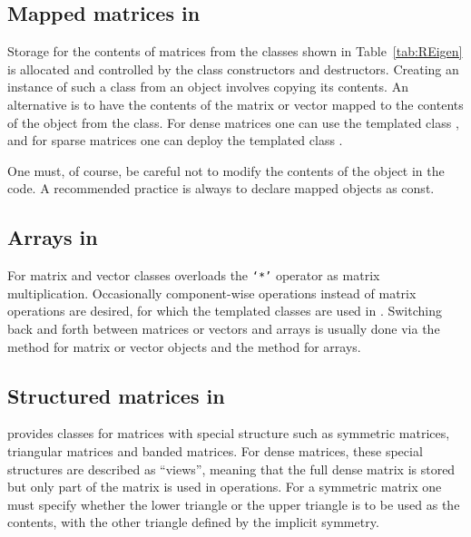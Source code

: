 \documentclass[shortnames,article]{jss}
\newcommand{\hlkwb}[1]{\textcolor[rgb]{0.13,0.54,0.13}{#1}}
\begin{document}
\subsection[Mapped matrices in Eigen]{Mapped matrices in }
\label{sec:mapped}

Storage for the contents of matrices from the classes shown in
Table~\ref{tab:REigen} is allocated and controlled by the class
constructors and destructors.  Creating an instance of such a class
from an  object involves copying its contents.  An
alternative is to have the contents of the  matrix or
vector mapped to the contents of the object from the  class.  For
dense matrices one can use the  templated class , and for
sparse matrices one can deploy the  templated class .

One must, of course, be careful not to modify the contents of the
 object in the  code.  A recommended
practice is always to declare mapped objects as {\ttfamily\hlkwb{const}\normalfont}.

\subsection[Arrays in Eigen]{Arrays in }
\label{sec:arrays}

For matrix and vector classes  overloads the \texttt{`*'}
operator as matrix multiplication.  Occasionally component-wise
operations instead of matrix operations are desired, for which the
 templated classes are used in .  Switching
back and forth between matrices or vectors and arrays is usually done
via the  method for matrix or vector objects and the
 method for arrays.

\subsection[Structured matrices in Eigen]{Structured matrices in }
\label{sec:structured}

 provides classes for matrices with special structure such
as symmetric matrices, triangular matrices and banded matrices.  For
dense matrices, these special structures are described as ``views'',
meaning that the full dense matrix is stored but only part of the
matrix is used in operations.  For a symmetric matrix one must
specify whether the lower triangle or the upper triangle is to be used as
the contents, with the other triangle defined by the implicit symmetry.
\end{document}
